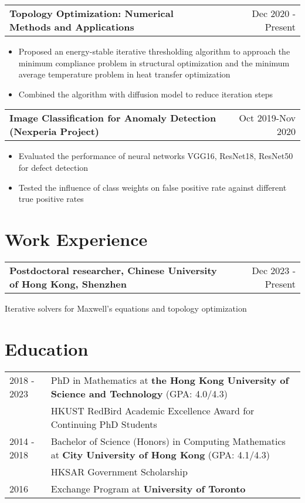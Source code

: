\documentclass[a4paper,10.5pt]{article}
\makeatletter
\newenvironment{jobshort}[2]
    {
    \begin{tabularx}{\linewidth}{@{}l X r@{}}
    \textbf{#1} & \hfill &  #2 \\[3.75pt]
    \end{tabularx}
    }
    {
    }
\newenvironment{joblong}[2]
    {
    \begin{tabularx}{\linewidth}{@{}l X r@{}}
    \textbf{#1} & \hfill &  #2 \\[3.75pt]
    \end{tabularx}
    \begin{minipage}[t]{\linewidth}
    \begin{itemize}[nosep,after=\strut, leftmargin=1em, itemsep=3pt,label=--]
    }
    {
    \end{itemize}
    \end{minipage}    
    }
\makeatother
\begin{document}
\begin{joblong}{Topology Optimization: Numerical Methods and Applications} {Dec 2020 - Present}
\item Proposed an energy-stable iterative thresholding algorithm to approach the minimum compliance problem in structural optimization and the minimum average temperature problem in heat transfer optimization
\item Combined the algorithm with diffusion model to reduce iteration steps
\end{joblong}

\begin{joblong}{Image Classification for Anomaly Detection (Nexperia Project)} {Oct 2019-Nov 2020}
    \item Evaluated the performance of neural networks VGG16, ResNet18, ResNet50 for defect detection
    \item Tested the influence of class weights on false positive rate against different true positive rates
\end{joblong}
  
\section{Work Experience}
\begin{jobshort}{Postdoctoral researcher, Chinese University of Hong Kong, Shenzhen}{Dec 2023 - Present}
Iterative solvers for Maxwell's equations and topology optimization
\end{jobshort}
\section{Education}
\begin{tabularx}{\linewidth}{@{}l X@{}}	
2018 - 2023 & PhD in Mathematics at \textbf{the Hong Kong University of Science and Technology} \hfill \normalsize (GPA: 4.0/4.3) \\
            & HKUST RedBird Academic Excellence Award for Continuing PhD Students \\
2014 - 2018 & Bachelor of Science (Honors) in Computing Mathematics at \textbf{City University of Hong Kong} \hfill (GPA: 4.1/4.3) \\ 
            & HKSAR Government Scholarship \\
2016 & Exchange Program at \textbf{University of Toronto}
\end{tabularx}
\end{document}

